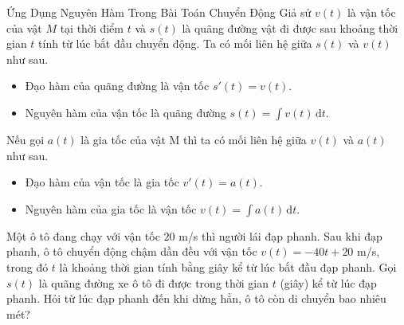 \begin{dang}{Ứng Dụng Nguyên Hàm Trong Bài Toán Chuyển Động}
	Giả sử $v(t)$ là vận tốc của vật $ {M}$ tại thời điểm $t$ và $s(t)$ là quãng đường vật đi được sau khoảng thời gian $t$ tính từ lúc bắt đầu chuyển động. Ta có mối liên hệ giữa $s(t)$ và $v(t)$ như sau.
	\begin{itemize}
		\item  Đạo hàm của quãng đường là vận tốc $s'(t)=v(t)$.
		\item  Nguyên hàm của vận tốc là quãng đường $s(t)=\displaystyle\int v(t)  \mathrm{\,d} t$.
	\end{itemize}
	Nếu gọi $a(t)$ là gia tốc của vật M thì ta có mối liên hệ giữa $v(t)$ và $a(t)$ như sau.
	\begin{itemize}
		\item Đạo hàm của vận tốc là gia tốc $v'(t)=a(t)$.
		\item Nguyên hàm của gia tốc là vận tốc $v(t)=\displaystyle\int\limits a(t)  \mathrm{\,d} t$.
	\end{itemize}
\end{dang}

\setcounter{ex}{0}
\begin{ex}%
	Một ô tô đang chạy với vận tốc $20$ m/s thì người lái đạp phanh. Sau khi đạp phanh, ô tô chuyển động chậm dần đều với vận tốc $v(t)=-40t+20$ m/s, trong đó $t$ là khoảng thời gian tính bằng giây kể từ lúc bắt đầu đạp phanh. Gọi  $s(t)$ là quãng đường xe ô tô đi được trong thời gian $t$  (giây) kể từ lúc đạp phanh. Hỏi từ lúc đạp phanh đến khi dừng hẳn, ô tô còn di chuyển bao nhiêu mét?
\end{ex}